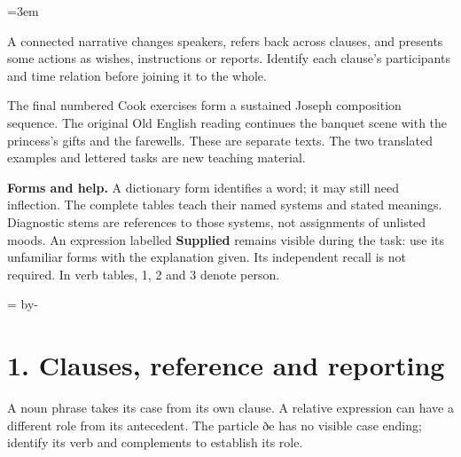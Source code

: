 \BookRecto
\begingroup
\renewcommand{\runningtitle}{Unit 18. Prose consolidation}
\emergencystretch=3em
\newcommand{\itempara}[2]{\par\addvspace{3pt}\noindent\hangindent=1.8em\hangafter=1\makebox[1.8em][l]{#1.}#2\par}
\newcommand{\reserve}[1]{\par\penalty-100\begingroup\dimen0=\pagegoal\advance\dimen0 by-\pagetotal\ifdim\dimen0<#1\newpage\fi\endgroup}

\raggedright
{}

A connected narrative changes speakers, refers back across clauses, and presents some actions as wishes, instructions or reports. Identify each clause’s participants and time relation before joining it to the whole.

The final numbered Cook exercises form a sustained Joseph composition sequence. The original Old English reading continues the banquet scene with the princess’s gifts and the farewells. These are separate texts. The two translated examples and lettered tasks are new teaching material.

\textbf{Forms and help.} A dictionary form identifies a word; it may still need inflection. The complete tables teach their named systems and stated meanings. Diagnostic stems are references to those systems, not assignments of unlisted moods. An expression labelled \textbf{Supplied} remains visible during the task: use its unfamiliar forms with the explanation given. Its independent recall is not required. In verb tables, 1, 2 and 3 denote person.

\reserve{7\baselineskip}
\section*{1. Clauses, reference and reporting}

A noun phrase takes its case from its own clause. A relative expression can have a different role from its antecedent. The particle ðe has no visible case ending; identify its verb and complements to establish its role.

